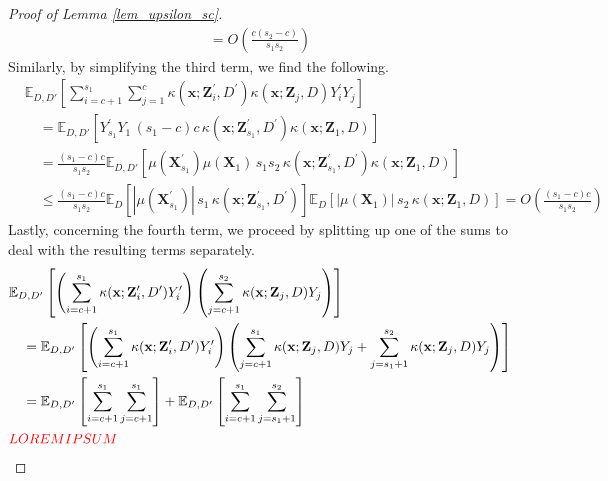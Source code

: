 \documentclass[letterpaper,10pt]{article}
\numberwithin{equation}{section}
\numberwithin{thm}{section}
\numberwithin{lem}{section}
\numberwithin{cor}{section}
\newcommand{\E}{\mathbb{E}}
\newcommand{\1}{\mathbbm{1}}
\begin{document}
\begin{proof}[Proof of Lemma \ref{lem_upsilon_sc}]
\begin{equation}
\begin{aligned}
			= O\left(\frac{c(s_2 - c)}{s_1 s_2}\right)
		\end{aligned}
	\end{equation}
	Similarly, by simplifying the third term, we find the following.
	\begin{equation}
		\begin{aligned}
			 & \E_{D, D'}\left[\sum_{i = c+1}^{s_1}\sum_{j = 1}^{c} \kappa(\mathbf{x}; \mathbf{Z}_i^{\prime}, D^{\prime})\kappa(\mathbf{x}; \mathbf{Z}_j, D)Y_i^{\prime} Y_j\right]                                                \\
			 & \quad = \E_{D, D'}\left[Y_{s_1}^{\prime} Y_{1} \, (s_1 - c)c \, \kappa(\mathbf{x}; \mathbf{Z}_{s_1}^{\prime}, D^{\prime})\kappa(\mathbf{x}; \mathbf{Z}_1, D)\right]                                                 \\
			 & \quad = \frac{(s_1 - c)c}{s_1 s_2}\E_{D, D'}\left[\mu(\mathbf{X}_{s_1}^{\prime})\mu(\mathbf{X}_1) \, s_1 s_2 \, \kappa(\mathbf{x}; \mathbf{Z}_{s_1}^{\prime}, D^{\prime})\kappa(\mathbf{x}; \mathbf{Z}_1, D)\right] \\
			 & \quad \leq \frac{(s_1 - c)c}{s_1 s_2}
			\E_{D}\left[|\mu(\mathbf{X}_{s_1}^{\prime})| \, s_1 \, \kappa(\mathbf{x}; \mathbf{Z}_{s_1}^{\prime}, D^{\prime})\right]
			\E_{D}\left[|\mu(\mathbf{X}_1)| \, s_2 \, \kappa(\mathbf{x}; \mathbf{Z}_1, D)\right]
			= O\left(\frac{(s_1 - c)c}{s_1 s_2}\right)
		\end{aligned}
	\end{equation}
	Lastly, concerning the fourth term, we proceed by splitting up one of the sums to deal with the resulting terms separately.
	\begin{equation}
		\begin{aligned}
			 & \E_{D, D'}\left[\left(\sum_{i = c+1}^{s_1}\kappa(\mathbf{x}; \mathbf{Z}_i^{\prime}, D^{\prime}) Y_i^{\prime}\right)
			\left(\sum_{j = c+1}^{s_2} \kappa(\mathbf{x}; \mathbf{Z}_j, D) Y_j\right)\right]                                                                  \\
			 & \quad =
			\E_{D, D'}\left[\left(\sum_{i = c+1}^{s_1}\kappa(\mathbf{x}; \mathbf{Z}_i^{\prime}, D^{\prime}) Y_i^{\prime}\right)
			\left(\sum_{j = c+1}^{s_1} \kappa(\mathbf{x}; \mathbf{Z}_j, D) Y_j 
			+ \sum_{j = s_1+1}^{s_2} \kappa(\mathbf{x}; \mathbf{Z}_j, D) Y_j\right)\right] \\
			& \quad = \E_{D, D'}\left[\sum_{i = c+1}^{s_1}\sum_{j = c+1}^{s_1}\right]
			+ \E_{D, D'}\left[\sum_{i = c+1}^{s_1}\sum_{j = s_1+1}^{s_2}\right]\\
			 & {\color{red} LOREM IPSUM}
		\end{aligned}
	\end{equation}
\end{proof}
\end{document}
